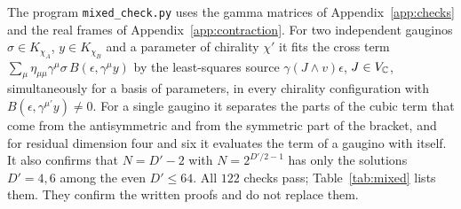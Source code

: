 The program \texttt{mixed\_check.py} uses the gamma matrices of Appendix~\ref{app:checks} and the real frames of Appendix~\ref{app:contraction}. For two independent gauginos $\sigma\in K_{\chi_A}$, $y\in K_{\chi_B}$ and a parameter of chirality $\chi'$ it fits the cross term $\sum_\mu\eta_{\mu\mu}\gamma^\mu\sigma\,B(\epsilon,\gamma^\mu y)$ by the least-squares source $\gamma(J\wedge v)\epsilon$, $J\in V_{\mathbb{C}}$, simultaneously for a basis of parameters, in every chirality configuration with $B(\epsilon,\gamma^{\mu'}y)\ne0$. For a single gaugino it separates the parts of the cubic term that come from the antisymmetric and from the symmetric part of the bracket, and for residual dimension four and six it evaluates the term of a gaugino with itself. It also confirms that $N=D'-2$ with $N=2^{D'/2-1}$ has only the solutions $D'=4,6$ among the even $D'\le64$. All $122$ checks pass; Table~\ref{tab:mixed} lists them. They confirm the written proofs and do not replace them.

